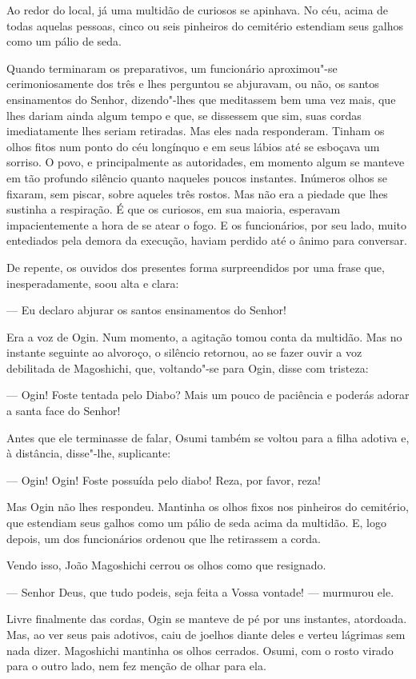 Ao redor do local, já uma multidão de curiosos se apinhava. No céu,
acima de todas aquelas pessoas, cinco ou seis pinheiros do cemitério
estendiam seus galhos como um pálio de seda.

Quando terminaram os preparativos, um funcionário aproximou"-se
cerimoniosamente dos três e lhes perguntou se abjuravam, ou não, os
santos ensinamentos do Senhor, dizendo"-lhes que meditassem bem uma vez
mais, que lhes dariam ainda algum tempo e que, se dissessem que sim,
suas cordas imediatamente lhes seriam retiradas. Mas eles nada
responderam. Tinham os olhos fitos num ponto do céu longínquo e em seus
lábios até se esboçava um sorriso. O povo, e principalmente as
autoridades, em momento algum se manteve em tão profundo silêncio
quanto naqueles poucos instantes. Inúmeros olhos se fixaram, sem
piscar, sobre aqueles três rostos. Mas não era a piedade que lhes
sustinha a respiração. É que os curiosos, em sua maioria, esperavam
impacientemente a hora de se atear o fogo. E os funcionários, por seu
lado, muito entediados pela demora da execução, haviam perdido até o
ânimo para conversar.

De repente, os ouvidos dos presentes forma surpreendidos por uma frase
que, inesperadamente, soou alta e clara:

--- Eu declaro abjurar os santos ensinamentos do Senhor!

Era a voz de Ogin. Num momento, a agitação tomou conta da multidão. Mas
no instante seguinte ao alvoroço, o silêncio retornou, ao se fazer
ouvir a voz debilitada de Magoshichi, que, voltando"-se para Ogin, disse
com tristeza:

--- Ogin! Foste tentada pelo Diabo? Mais um pouco de paciência e poderás
adorar a santa face do Senhor!

Antes que ele terminasse de falar, Osumi também se voltou para a filha
adotiva e, à distância, disse"-lhe, suplicante:

--- Ogin! Ogin! Foste possuída pelo diabo! Reza, por favor, reza!

Mas Ogin não lhes respondeu. Mantinha os olhos fixos nos pinheiros do
cemitério, que estendiam seus galhos como um pálio de seda acima da
multidão. E, logo depois, um dos funcionários ordenou que lhe
retirassem a corda.

Vendo isso, João Magoshichi cerrou os olhos como que resignado.

--- Senhor Deus, que tudo podeis, seja feita a Vossa vontade! --- murmurou ele.

Livre finalmente das cordas, Ogin se manteve de pé por uns instantes,
atordoada. Mas, ao ver seus pais adotivos, caiu de joelhos diante deles
e verteu lágrimas sem nada dizer. Magoshichi mantinha os olhos
cerrados. Osumi, com o rosto virado para o outro lado, nem fez menção
de olhar para ela.

